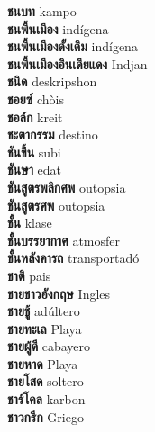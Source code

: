 \textbf{ ชนบท  } kampo \\
\textbf{ ชนพื้นเมือง  } indígena \\
\textbf{ ชนพื้นเมืองดั้งเดิม  } indígena \\
\textbf{ ชนพื้นเมืองอินเดียแดง  } Indjan \\
\textbf{ ชนิด  } deskripshon \\
\textbf{ ชอยซ์  } chòis \\
\textbf{ ชอล์ก  } kreit \\
\textbf{ ชะตากรรม  } destino \\
\textbf{ ชันขึ้น  } subi \\
\textbf{ ชันษา  } edat \\
\textbf{ ชันสูตรพลิกศพ  } outopsia \\
\textbf{ ชันสูตรศพ  } outopsia \\
\textbf{ ชั้น  } klase \\
\textbf{ ชั้นบรรยากาศ  } atmosfer \\
\textbf{ ชั้นหลังคารถ  } transportadó \\
\textbf{ ชาติ  } pais \\
\textbf{ ชายชาวอังกฤษ  } Ingles \\
\textbf{ ชายชู้  } adúltero \\
\textbf{ ชายทะเล  } Playa \\
\textbf{ ชายผู้ดี  } cabayero \\
\textbf{ ชายหาด  } Playa \\
\textbf{ ชายโสด  } soltero \\
\textbf{ ชาร์โคล  } karbon \\
\textbf{ ชาวกรีก  } Griego \\
